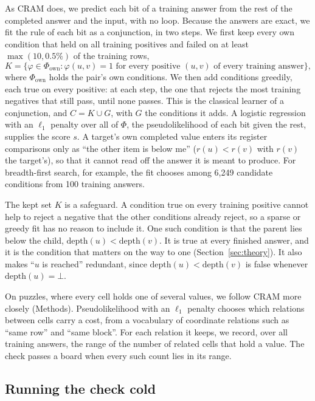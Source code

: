 \documentclass[10pt]{article}
\newcommand{\notyet}{\bot}
\begin{document}
As CRAM does, we predict each bit of a training answer from the rest of the completed answer and the input, with no
loop. Because the answers are exact, we fit the rule of each bit as a conjunction, in two steps. We first keep every own
condition that held on all training positives and failed on at least $\max(10, 0.5\%)$ of the training rows,
\begin{equation}
K = \{\varphi \in \Phi_{\mathrm{own}} : \varphi(u,v) = 1 \text{ for every positive } (u,v) \text{ of every training answer}\},
\label{eq:kept}
\end{equation}
where $\Phi_{\mathrm{own}}$ holds the pair's own conditions. We then add conditions greedily, each true on every positive:
at each step, the one that rejects the most training negatives that still pass, until none passes. This is the classical
learner of a conjunction\cite{haussler1988quantifying}, and $C = K \cup G$, with $G$ the conditions it adds. A logistic
regression with an $\ell_1$ penalty over all of $\Phi$, the pseudolikelihood of each bit given the rest, supplies the
score $s$. A target's own completed value enters its register comparisons only as ``the other item is below me'' ($r(u) < r(v)$
with $r(v)$ the target's), so that it cannot read off the answer it is meant to produce. For breadth-first search, for example, the fit
chooses among 6,249 candidate conditions from 100 training answers.

The kept set $K$ is a safeguard. A condition true on every training positive cannot help to reject a negative that the
other conditions already reject, so a sparse or greedy fit has no reason to include it. One such condition is that the
parent lies below the child, $\mathrm{depth}(u) < \mathrm{depth}(v)$. It is true at every finished answer, and it is
the condition that matters on the way to one (Section~\ref{sec:theory}). It also makes ``$u$ is reached'' redundant,
since $\mathrm{depth}(u) < \mathrm{depth}(v)$ is false whenever $\mathrm{depth}(u) = \notyet$.

On puzzles, where every cell holds one of several values, we follow CRAM more closely (Methods). Pseudolikelihood with
an $\ell_1$ penalty chooses which relations between cells carry a cost, from a vocabulary of coordinate relations such
as ``same row'' and ``same block''. For each relation it keeps, we record, over all training answers, the range of the
number of related cells that hold a value. The check passes a board when every such count lies in its range.

\subsection{Running the check cold}
\end{document}
